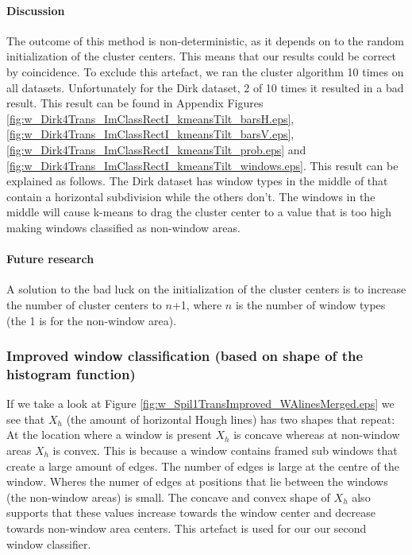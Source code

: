 \paragraph{Discussion}  %
The outcome of this method is non-deterministic, as it depends on to the random
initialization of the cluster centers. This means that our results could be
correct by coincidence.  To exclude this artefact, we ran the cluster algorithm
10 times on all datasets. Unfortunately for the Dirk dataset, 2 of 10 times it 
resulted in a bad result. This result can be found in Appendix
Figures \ref{fig:w_Dirk4Trans_ImClassRectI_kmeansTilt_barsH.eps},
\ref{fig:w_Dirk4Trans_ImClassRectI_kmeansTilt_barsV.eps},
\ref{fig:w_Dirk4Trans_ImClassRectI_kmeansTilt_prob.eps} and
\ref{fig:w_Dirk4Trans_ImClassRectI_kmeansTilt_windows.eps}.
This result can be explained as follows. The Dirk dataset has window types in the
middle of that contain a horizontal subdivision while the others don't.
The windows in the middle will cause k-means to drag the cluster center to a
value that is too high making windows classified as non-window areas.

\paragraph{Future research}
A solution to the bad luck on the initialization of the cluster centers 
is to increase the number of cluster centers to $n$+1, 
where $n$ is the number of window types (the 1 is for the non-window area).




\subsubsection{Improved window classification (based on shape of the histogram function)}
If we take a look at Figure \ref{fig:w_Spil1TransImproved_WAlinesMerged.eps}
we see that $X_h$ (the amount of horizontal Hough lines) has two shapes that
repeat:  At the location where a window is present $X_h$ is concave whereas at
non-window areas $X_h$ is convex. 
This is because a window contains framed sub windows that create 
a large amount of edges. The number of edges is large at the centre of the
window.  Wheres the numer of edges at positions that lie between the windows
(the non-window areas) is small.
The concave and convex shape of $X_h$ also supports that these values 
increase towards the window center and decrease towards
non-window area centers. This artefact is used for our 
our second window classifier.\\

